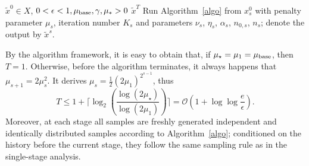 \documentclass[11pt]{article}
\numberwithin{equation}{section}
\newcommand{\be}{\begin{equation}}
\newcommand{\ee}{\end{equation}}
\begin{document}
\begin{algorithm}[ht]
\caption{Multi-stage mirror descent linearized augmented Lagrangian method}
\label{algo:restart}
\begin{algorithmic}[1]
\REQUIRE \(\tilde x^0\in X\), \(0<\epsilon<1, \mu_{\rm base}, \gamma, \mu_*>0\)
\ENSURE $\tilde x^T$
\STATE Run Algorithm~\ref{algo} from \(x_s^0\) with penalty parameter  \(\mu_s\), iteration number \(K_s\) and parameters \(\nu_s\), \(\eta_s\), \(\alpha_s\), \(n_{0,s}\), \(n_s\);   denote the output  by \(\tilde x^s\).
\ENDIF
\ENDFOR
\end{algorithmic} 
\end{algorithm}
By the algorithm framework, it is easy to obtain that, if \(\mu_\star=\mu_1=\mu_{\rm base}\), then \(T=1\). Otherwise, before the algorithm terminates, it always happens that \(\mu_{s+1}=2\mu_s^2\). It derives \(\mu_s=\frac12(2\mu_1)^{2^{s-1}}\), thus
\be\label{O_T}
T\le1+\lceil\log_2(\frac{\log(2\mu_\star)}{\log(2\mu_1)})\rceil
=\mathcal O(1+\log\log\frac{e}{\epsilon}).\ee
Moreover, at each  stage all samples are freshly generated independent and identically distributed  samples according to Algorithm~\ref{algo}; conditioned on the history before the current stage, they follow the same sampling rule as in the single-stage analysis.
\end{document}
